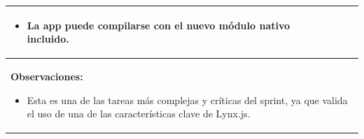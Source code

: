 \begin{table}[H]
\begin{center}
\begin{tabularx}{\textwidth}{|l|X|l|}
{\begin{itemize}
                    \item La app puede compilarse con el nuevo módulo nativo incluido.
                \end{itemize}
            }\\
            \hline
            \multicolumn{3}{|p{\textwidth}|}{
                \textbf{Observaciones:}
                \begin{itemize}
                    \item Esta es una de las tareas más complejas y críticas del sprint, ya que valida el uso de una de las características clave de Lynx.js.
                \end{itemize}
            }\\
            \hline
        \end{tabularx}
    \end{center}
\end{table}


